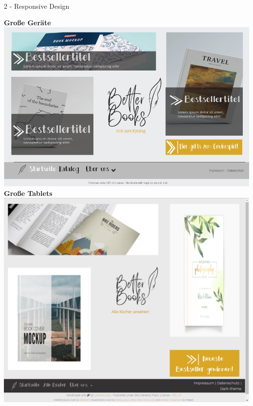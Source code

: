 \documentclass[a4paper]{article}
\begin{document}
\begin{exercise}{2 - Responsive Design}
\begin{flushleft}
{\Large \textbf{Große Geräte}}\\
\includegraphics[scale=0.5]{../1_bookstore_main}\\
\newpage
{\Large \textbf{Große Tablets}}\\
\includegraphics[scale=0.5]{../2_bookstore_main_large-tab}\\


\end{flushleft}
\end{exercise}
\end{document}
